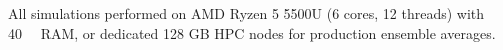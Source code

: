 \documentclass[11pt,a4paper]{article}
\begin{document}
All simulations performed on AMD Ryzen 5 5500U (6 cores, 12 threads) with \SI{40}{\giga\byte} RAM, or dedicated 128 GB HPC nodes for production ensemble averages.









\end{document}
